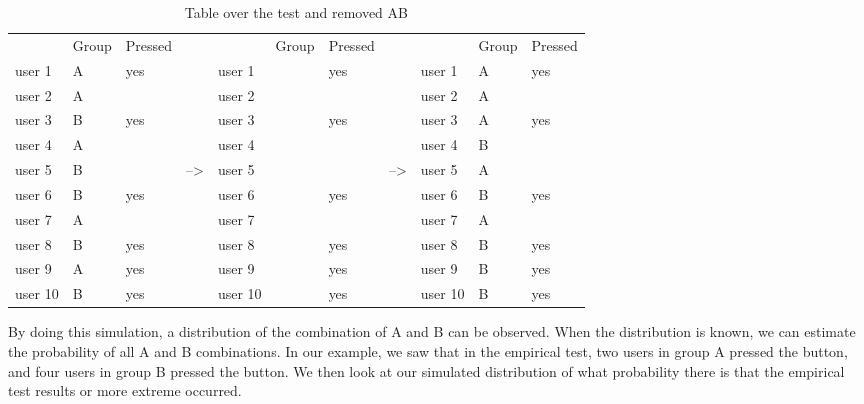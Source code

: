 \begin{table}[H]
\begin{tabular}{|l|l|l|l|l|l|l|l|l|l|l|}
\cline{1-3} \cline{5-7} \cline{9-11}
        & Group & Pressed &                  &         & Group & Pressed &                  &         & Group & Pressed \\ \cline{1-3} \cline{5-7} \cline{9-11} 
user 1  & A     & yes     &                  & user 1  &       & yes     &                  & user 1  & A     & yes     \\ \cline{1-3} \cline{5-7} \cline{9-11} 
user 2  & A     &         &                  & user 2  &       &         &                  & user 2  & A     &         \\ \cline{1-3} \cline{5-7} \cline{9-11} 
user 3  & B     & yes     &                  & user 3  &       & yes     &                  & user 3  & A     & yes     \\ \cline{1-3} \cline{5-7} \cline{9-11} 
user 4  & A     &         &                  & user 4  &       &         &                  & user 4  & B     &         \\ \cline{1-3} \cline{5-7} \cline{9-11} 
user 5  & B     &         & --\textgreater{} & user 5  &       &         & --\textgreater{} & user 5  & A     &         \\ \cline{1-3} \cline{5-7} \cline{9-11} 
user 6  & B     & yes     &                  & user 6  &       & yes     &                  & user 6  & B     & yes     \\ \cline{1-3} \cline{5-7} \cline{9-11} 
user 7  & A     &         &                  & user 7  &       &         &                  & user 7  & A     &         \\ \cline{1-3} \cline{5-7} \cline{9-11} 
user 8  & B     & yes     &                  & user 8  &       & yes     &                  & user 8  & B     & yes     \\ \cline{1-3} \cline{5-7} \cline{9-11} 
user 9  & A     & yes     &                  & user 9  &       & yes     &                  & user 9  & B     & yes     \\ \cline{1-3} \cline{5-7} \cline{9-11} 
user 10 & B     & yes     &                  & user 10 &       & yes     &                  & user 10 & B     & yes     \\ \cline{1-3} \cline{5-7} \cline{9-11} 
\end{tabular}
\caption{Table over the test and removed AB}
\label{tab:abProg}
\end{table}


By doing this simulation, a distribution of the combination of A and B can be observed. When the distribution is known, we can estimate the probability of all A and B combinations. In our example, we saw that in the empirical test, two users in group A pressed the button, and four users in group B pressed the button.  We then look at our simulated distribution of what probability there is that the empirical test results or more extreme occurred.  

